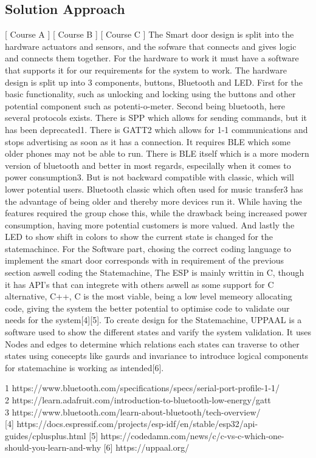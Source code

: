 \subsection{Solution Approach}
[ Course A ] [ Course B ] [ Course C ] 
\newline
The Smart door design is split into the hardware actuators and sensors, and the sofware that connects and gives logic and connects them together. For the hardware to work it must have a software that supports it for our requirements for the system to work. 
The hardware design is split up into 3 components, buttons, Bluetooth and LED.  First for the basic functionality, such as unlocking and locking using the buttons and other potential component such as potenti-o-meter. Second being bluetooth, here several protocols exists. There is SPP which allows for sending commands, but it has been deprecated1. There is GATT2 which allows for 1-1 communications and stops advertising as soon as it has a connection. It requires BLE which some older phones may not be able to run. There is BLE itself which is a more modern version of bluetooth and better in most regards, especilally when it comes to power consumption3. But is not backward compatible with classic, which will lower potential users. Bluetooth classic which often used for music transfer3 has the advantage of being older and thereby more devices run it. While having the features required the group chose this, while the drawback being increased power consumption, having more potential customers is more valued. And lastly the LED to show shift in colors to show the current state is changed for the statemachince.
For the Software part, chosing the correct coding language to implement the smart door corresponds with in requirement of the previous section aswell coding the Statemachine, The ESP is mainly writtin in C, though it has API’s that can integrete with others aswell as some support for C alternative, C++, C is the most viable, being a low level memeory allocating code, giving the system the better potential to optimise code to validate our needs for the system[4][5]. 
To create design for the Statemachine, UPPAAL is a software used to show the different states and varify the system validation. It uses Nodes and edges to determine which relations each states can traverse to other states using conecepts like gaurds and invariance to introduce logical components for statemachine is working as intended[6]. 


1 https://www.bluetooth.com/specifications/specs/serial-port-profile-1-1/\\
2 https://learn.adafruit.com/introduction-to-bluetooth-low-energy/gatt\\
3 https://www.bluetooth.com/learn-about-bluetooth/tech-overview/\\
 
[4] https://docs.espressif.com/projects/esp-idf/en/stable/esp32/api-guides/cplusplus.html
[5] https://codedamn.com/news/c/c-vs-c-which-one-should-you-learn-and-why 
[6] https://uppaal.org/ 
